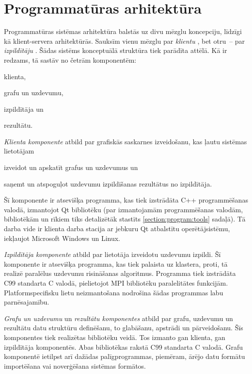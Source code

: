 
\section{Programmatūras arhitektūra}
Programmatūras sistēmas arhitektūra balstās uz divu mēzglu koncepciju, līdzīgi kā
klient-servera arhitektūrās. Sauksīm vienu mēzglu par \emph{klientu} ,
bet otru~-- par \emph{izpildītāju} . Šādas sistēms
konceptuālā struktūra tiek parādīta  attēlā. Kā ir redzams, tā
sastāv no četrām komponentēm:
\begin{numlist}
	\item klienta,
	\item grafu un uzdevumu,
	\item izpildītāja un
	\item rezultātu.
\end{numlist}

\emph{Klienta komponente} atbild par grafiskās saskarnes izveidošanu, kas ļautu sistēmas
lietotājam
\begin{dotlist}
	\item izveidot un apskatīt grafus un uzdevumus un
	\item saņemt un atspoguļot uzdevumu izpildīšanas rezultātus no izpildītāja.
\end{dotlist}
Šī komponente ir atsevišķa programma, kas tiek izstrādāta C++ programmēšanas valodā,
izmantojot Qt bibliotēku (par izmantojamām programmēšanas valodām, bibliotēkām un
rīkiem tiks detalizētāk stastīts \ref{section:program:tools} sadaļā). Tā darba vide
ir klienta darba stacija ar jebkuru Qt atbalstītu operētājsistēmu, iekļaujot Microsoft
Windows un Linux.

\emph{Izpildītāja komponente} atbild par lietotāja izveidotu uzdevumu izpildi. Šī
komponente ir atsevišķa programma, kas tiek palaista uz klastera, proti, tā realizē
paralēlus uzdevumu risināšanas algoritmus. Programma tiek izstrādāta C99 standarta C valodā,
pielietojot MPI bibliotēku paralelitātes funkcijām. Platformspecifisku lietu neizmantošana
nodrošina šādas programmas labu parnēsajamību.

\emph{Grafu un uzdevumu} un \emph{rezultātu komponentes} atbild par grafu, uzdevumu
un rezultātu datu struktūru definēšanu, to glabāšanu, apstrādi un pārveidošanu.
Šīs komponentes tiek realizētas bibliotēku veidā. Tos izmanto gan klienta, gan
izpildītāja komponentēs. Abas bibliotēkas rakstā C99 standarta C valodā. Grafu
komponentē ietilpst arī dažādas palīgprogrammas, piemēram, ārējo datu formātu
importēšana vai noverģēšana sistēmas formātos.

